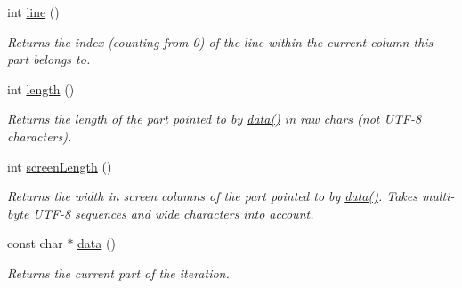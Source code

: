 \begin{DoxyCompactItemize}
int \hyperlink{classoption_1_1PrintUsageImplementation_1_1LinePartIterator_a8ad1201d95bf0bd9453a731da8c15a10}{line} ()
\begin{DoxyCompactList}\small\item\em Returns the index (counting from 0) of the line within the current column this part belongs to. \end{DoxyCompactList}\item 
\mbox{\label{classoption_1_1PrintUsageImplementation_1_1LinePartIterator_a557e521cb41e951a34df2737d25f9dce}} 
int \hyperlink{classoption_1_1PrintUsageImplementation_1_1LinePartIterator_a557e521cb41e951a34df2737d25f9dce}{length} ()
\begin{DoxyCompactList}\small\item\em Returns the length of the part pointed to by \hyperlink{classoption_1_1PrintUsageImplementation_1_1LinePartIterator_ada26229add63bd479c7877f2f8e32908}{data()} in raw chars (not U\+T\+F-\/8 characters). \end{DoxyCompactList}\item 
\mbox{\label{classoption_1_1PrintUsageImplementation_1_1LinePartIterator_a03b6fedfe805d7fc73216da5cd33270e}} 
int \hyperlink{classoption_1_1PrintUsageImplementation_1_1LinePartIterator_a03b6fedfe805d7fc73216da5cd33270e}{screen\+Length} ()
\begin{DoxyCompactList}\small\item\em Returns the width in screen columns of the part pointed to by \hyperlink{classoption_1_1PrintUsageImplementation_1_1LinePartIterator_ada26229add63bd479c7877f2f8e32908}{data()}. Takes multi-\/byte U\+T\+F-\/8 sequences and wide characters into account. \end{DoxyCompactList}\item 
\mbox{\label{classoption_1_1PrintUsageImplementation_1_1LinePartIterator_ada26229add63bd479c7877f2f8e32908}} 
const char $\ast$ \hyperlink{classoption_1_1PrintUsageImplementation_1_1LinePartIterator_ada26229add63bd479c7877f2f8e32908}{data} ()
\begin{DoxyCompactList}\small\item\em Returns the current part of the iteration. \end{DoxyCompactList}\end{DoxyCompactItemize}


